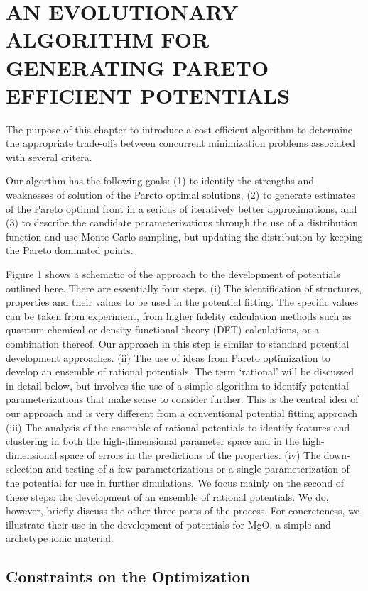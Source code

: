 \chapter{AN EVOLUTIONARY ALGORITHM FOR GENERATING PARETO EFFICIENT POTENTIALS}

The purpose of this chapter to introduce a cost-efficient algorithm to determine the appropriate trade-offs between concurrent minimization problems associated with several critera.

Our algorthm has the following goals: (1) to identify the strengths and weaknesses of solution of the Pareto optimal solutions, (2) to generate estimates of the Pareto optimal front in a serious of iteratively better approximations, and (3) to describe the candidate parameterizations through the use of a distribution function and use Monte Carlo sampling, but updating the distribution by keeping the Pareto dominated points.



Figure 1 shows a schematic of the approach to the development of potentials outlined here. There are essentially four steps.
(i) The identification of structures, properties and their values to be used in the potential fitting. The specific values can be taken from experiment, from higher fidelity calculation methods such as quantum chemical or density functional theory (DFT) calculations, or a combination thereof. Our approach in this step is similar to standard potential development approaches.
 (ii) The use of ideas from Pareto optimization to develop an ensemble of rational potentials. The term ‘rational’ will be discussed in detail below, but involves the use of a simple algorithm to identify potential parameterizations that make sense to consider further. This is the central idea of our approach and is very different from a conventional potential fitting approach
(iii) The analysis of the ensemble of rational potentials to identify features and clustering in both the high-dimensional parameter space and in the high-dimensional space of errors in the predictions of the properties.
(iv) The down-selection and testing of a few parameterizations or a single parameterization of the potential for use in further simulations.
We focus mainly on the second of these steps: the development of an ensemble of rational potentials. We do, however, briefly discuss the other three parts of the process. For concreteness, we illustrate their use in the development of potentials for MgO, a simple and archetype ionic material.


\section{Constraints on the Optimization}

